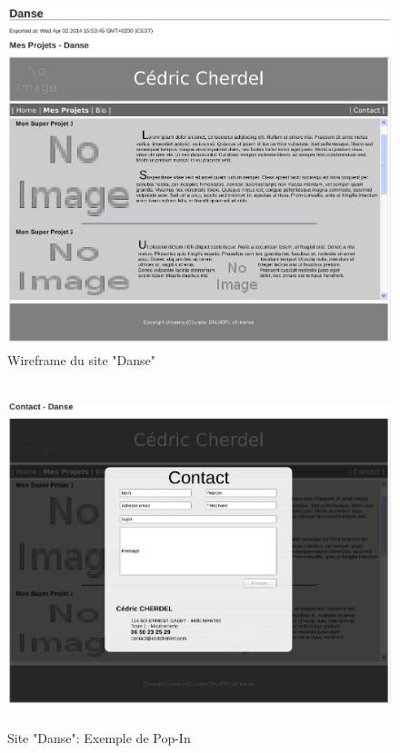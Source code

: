 \documentclass[11pt,a4paper]{report}
\begin{document}
				\begin{figure}[H]
					\centering
					\includegraphics[height=10cm]{Wireframe-Danse_1.eps}
					\caption{Wireframe du site "Danse"}
					\label{fig:Wireframe-Danse_1}
				\end{figure}
				\begin{figure}[H]
					\centering
					\includegraphics[height=10cm]{Wireframe-Danse_2.eps}
					\caption{Site "Danse": Exemple de Pop-In}
					\label{fig:Wireframe-Danse_2}
				\end{figure}
\end{document}
